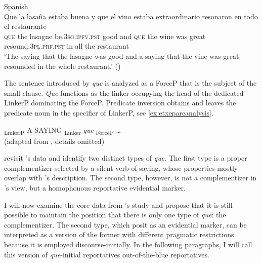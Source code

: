 \ea\label{ex:etxnumber} Spanish \\\gll Que la lasaña estaba buena y que el vino estaba extraordinario resonaron en todo el restaurante\\
\textsc{que} the lasagne be.\textsc{3sg.ipfv.pst} good and \textsc{que} the wine was great resound.\textsc{3pl.prf.pst} in all the restaurant\\
\glt `The saying that the lasagne was good and a saying that the vine was great
resounded in the whole restaurant.' (\citealt[620: ex 59]{Etxepare2010})
\z

The sentence introduced by \emph{que} is analyzed as a ForceP that is the subject of the small clause. \emph{Que} functions as the linker occupying the head of the dedicated LinkerP dominating the ForceP. Predicate inversion obtains and leaves the predicate noun in the specifier of LinkerP, see \eqref{ex:etxepareanalysis}.

\ea\label{ex:etxepareanalysis} {\ob}\textsubscript{LinkerP} {\ob} A SAYING {\cb} {\ob}\textsubscript{Linker} \emph{que} {\cb} {\ob}\textsubscript{ForceP} {\ob} \dots {\cb}{\cb}{\cb} \\(adapted from \citealt[98: ex 14]{Etxepare2013}, details omitted)
\z



\citet{DemonteSoriano2014}  revisit \citeauthor{Etxepare2007}'s data and identify two distinct types of \emph{que}.  The first type is a proper complementizer selected by a silent verb of saying, whose  properties mostly overlap with \citeauthor{Etxepare2007}'s description. The second type, however, is   not  a complementizer  in \citeauthor{DemonteSoriano2014}'s view, but a homophonous reportative evidential marker. 

I will now examine the core data from \citeauthor{DemonteSoriano2014}'s study  and propose that it is still possible to  maintain the position that there is only one type of \emph{que}: the complementizer. The second type, which \citet{DemonteSoriano2014} posit as  an evidential marker, can be interpreted as a version of the former with  different pragmatic restrictions because it is employed discourse-initially. In the following paragraphs, I will call this version of \emph{que}-initial reportatives out-of-the-blue reportatives.

